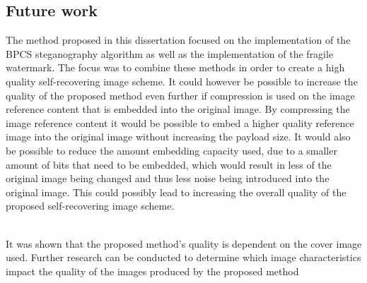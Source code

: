\documentclass[12pt]{article}
\begin{document}
\subsection{Future work}
The method proposed in this dissertation focused on the implementation of the BPCS steganography algorithm as well as the implementation of the fragile watermark. The focus was to combine these methods in order to create a high quality self-recovering image scheme.
It could however be possible to increase the quality of the proposed method even further if compression is used on the image reference content that is embedded into the original image.
By compressing the image reference content it would be possible to embed a higher quality reference image into the original image without increasing the payload size.
It would also be possible to reduce the amount embedding capacity used, due to a smaller amount of bits that need to be embedded, which would result in less of the original image being changed and thus less noise being introduced into the original image.
This could possibly lead to increasing the overall quality of the proposed self-recovering image scheme.

\hspace{0pt} \\
It was shown that the proposed method's quality is dependent on the cover image used. Further research can be conducted to determine which image characteristics impact the quality of the images produced by the proposed method



\end{document}
